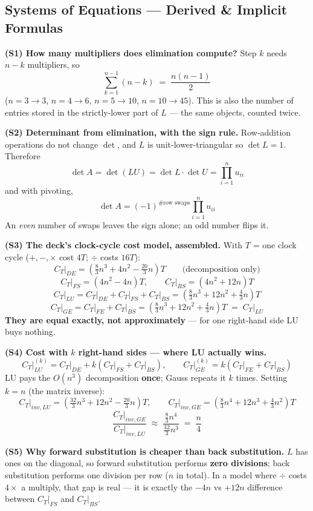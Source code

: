 \subsection{Systems of Equations --- Derived \& Implicit Formulas}

\begin{derivedbox}
\textbf{(S1) How many multipliers does elimination compute?} Step $k$ needs $n-k$ multipliers, so
\[
\sum_{k=1}^{n-1}(n-k) \;=\; \boxed{\frac{n(n-1)}{2}}
\]
($n=3\to3$, $n=4\to6$, $n=5\to10$, $n=10\to45$). This is also the number of entries stored in the strictly-lower part of $L$ --- the same objects, counted twice.

\smallskip
\textbf{(S2) Determinant from elimination, with the sign rule.} Row-addition operations do not change $\det$, and $L$ is unit-lower-triangular so $\det L = 1$. Therefore
\[
\det A = \det(LU) = \det L \cdot \det U = \prod_{i=1}^{n} u_{ii}
\]
and with pivoting,
\[
\boxed{\det A = (-1)^{\#\text{row swaps}}\prod_{i=1}^{n}u_{ii}}
\]
An \emph{even} number of swaps leaves the sign alone; an odd number flips it.

\smallskip
\textbf{(S3) The deck's clock-cycle cost model, assembled.} With $T$ = one clock cycle ($+,-,\times$ cost $4T$; $\div$ costs $16T$):
\[
C_T\big|_{DE} = \left(\tfrac83 n^3 + 4n^2 - \tfrac{20}{3}n\right)T \qquad\text{(decomposition only)}
\]
\[
C_T\big|_{FS} = (4n^2-4n)T, \qquad C_T\big|_{BS} = (4n^2+12n)T
\]
\[
C_T\big|_{LU} = C_T\big|_{DE} + C_T\big|_{FS} + C_T\big|_{BS} = \left(\tfrac83n^3 + 12n^2 + \tfrac43 n\right)T
\]
\[
C_T\big|_{GE} = C_T\big|_{FE} + C_T\big|_{BS} = \left(\tfrac83n^3 + 12n^2 + \tfrac43 n\right)T \;=\; C_T\big|_{LU}
\]
\textbf{They are equal exactly, not approximately} --- for one right-hand side LU buys nothing.

\smallskip
\textbf{(S4) Cost with $k$ right-hand sides --- where LU actually wins.}
\[
C_T\big|_{LU}^{(k)} = C_T\big|_{DE} + k\left(C_T\big|_{FS} + C_T\big|_{BS}\right), \qquad
C_T\big|_{GE}^{(k)} = k\left(C_T\big|_{FE} + C_T\big|_{BS}\right)
\]
LU pays the $O(n^3)$ decomposition \textbf{once}; Gauss repeats it $k$ times. Setting $k=n$ (the matrix inverse):
\[
C_T\big|_{inv,LU} = \left(\tfrac{32}{3}n^3 + 12n^2 - \tfrac{20}{3}n\right)T,
\qquad
C_T\big|_{inv,GE} = \left(\tfrac83 n^4 + 12n^3 + \tfrac43 n^2\right)T
\]
\[
\frac{C_T|_{inv,GE}}{C_T|_{inv,LU}} \;\approx\; \frac{\tfrac83 n^4}{\tfrac{32}{3}n^3} \;=\; \boxed{\frac{n}{4}}
\]

\smallskip
\textbf{(S5) Why forward substitution is cheaper than back substitution.} $L$ has ones on the diagonal, so forward substitution performs \textbf{zero divisions}; back substitution performs one division per row ($n$ in total). In a model where $\div$ costs $4\times$ a multiply, that gap is real --- it is exactly the $-4n$ vs $+12n$ difference between $C_T|_{FS}$ and $C_T|_{BS}$.


\end{derivedbox}

